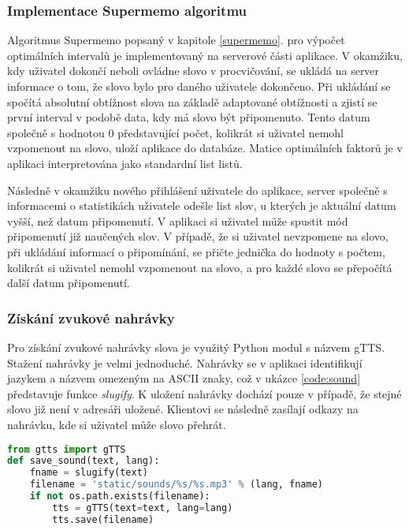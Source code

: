 \documentclass[a4paper,11pt,titlepage,fleqn]{article}
\begin{document}
        \subsubsection{Implementace Supermemo algoritmu}
            Algoritmus Supermemo popsaný v kapitole \ref{supermemo}. pro výpočet optimálních intervalů je implementovaný na serverové části aplikace. V okamžiku, kdy uživatel dokončí neboli ovládne slovo v procvičování, se ukládá na server informace o tom, že slovo bylo pro daného uživatele dokončeno. Při ukládání se spočítá absolutní obtížnost slova na základě adaptované obtížnosti a zjistí se první interval v podobě data, kdy má slovo být připomenuto. Tento datum společně s hodnotou 0 představující počet, kolikrát si uživatel nemohl vzpomenout na slovo, uloží aplikace do databáze. Matice optimálních faktorů je v aplikaci interpretována jako standardní list listů.

            Následně v okamžiku nového přihlášení uživatele do aplikace, server společně s informacemi o statistikách uživatele odešle list slov, u kterých je aktuální datum vyšší, než datum připomenutí. V aplikaci si uživatel může spustit mód připomenutí již naučených slov. V případě, že si uživatel nevzpomene na slovo, při ukládání informací o připomínání, se přičte jednička do hodnoty s počtem, kolikrát si uživatel nemohl vzpomenout na slovo, a pro každé slovo se přepočítá další datum připomenutí. 

        \subsubsection{Získání zvukové nahrávky}
            Pro získání zvukové nahrávky slova je využitý Python modul s názvem gTTS. Stažení nahrávky je velmi jednoduché. Nahrávky se v aplikaci identifikují jazykem a názvem omezeným na ASCII znaky, což v ukázce \ref{code:sound} představuje funkce \textit{slugify}. K uložení nahrávky dochází pouze v případě, že stejné slovo již není v adresáři uložené. Klientovi se následně zasílají odkazy na nahrávku, kde si uživatel může slovo přehrát.

\begin{minipage}[c]{0.95\textwidth}
\begin{lstlisting}[language=Python, caption={Uložení zvukové nahrávky},label=code:sound]
from gtts import gTTS
def save_sound(text, lang):
    fname = slugify(text)
    filename = 'static/sounds/%s/%s.mp3' % (lang, fname)
    if not os.path.exists(filename):
        tts = gTTS(text=text, lang=lang)
        tts.save(filename)
\end{lstlisting}
\end{minipage}
\end{document}
